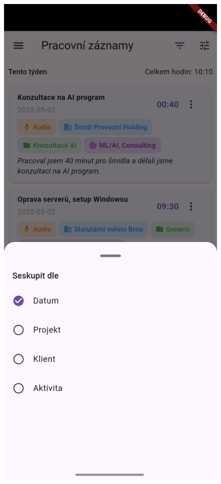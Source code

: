 \documentclass[
  digital,     %
  oneside,     %
  nosansbold,  %
  nocolorbold, %
  lof,         %
  lot,         %
]{fithesis4}
\begin{document}
\vspace{1em}

\begin{center}
\begin{minipage}{0.45\textwidth}
  \begin{figure}[H]
    \centering
    \includegraphics[width=\textwidth]{assets/group_records_by.png}

\end{figure}
\end{minipage}
\end{center}
\end{document}
